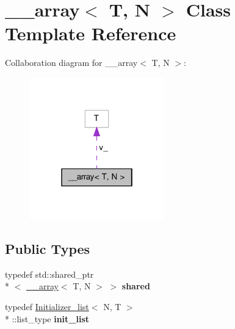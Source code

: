 \hypertarget{class____array}{\section{\-\_\-\-\_\-array$<$ T, N $>$ Class Template Reference}
\label{class____array}
}


Collaboration diagram for \-\_\-\-\_\-array$<$ T, N $>$\-:\nopagebreak
\begin{figure}[H]
\begin{center}
\leavevmode
\includegraphics[width=166pt]{class____array__coll__graph}
\end{center}
\end{figure}
\subsection*{Public Types}
\begin{DoxyCompactItemize}
\item 
\hypertarget{class____array_a90230a0abce0d451b9425b69b24534e5}{typedef std\-::shared\-\_\-ptr\\*
$<$ \hyperlink{class____array}{\-\_\-\-\_\-array}$<$ T, N $>$ $>$ {\bfseries shared}}\label{class____array_a90230a0abce0d451b9425b69b24534e5}

\item 
\hypertarget{class____array_ab58bead881f51e40d3fb088e8adb2d77}{typedef \hyperlink{structInitializer__list}{Initializer\-\_\-list}$<$ N, T $>$\\*
\-::list\-\_\-type {\bfseries init\-\_\-list}}\label{class____array_ab58bead881f51e40d3fb088e8adb2d77}

\end{DoxyCompactItemize}
